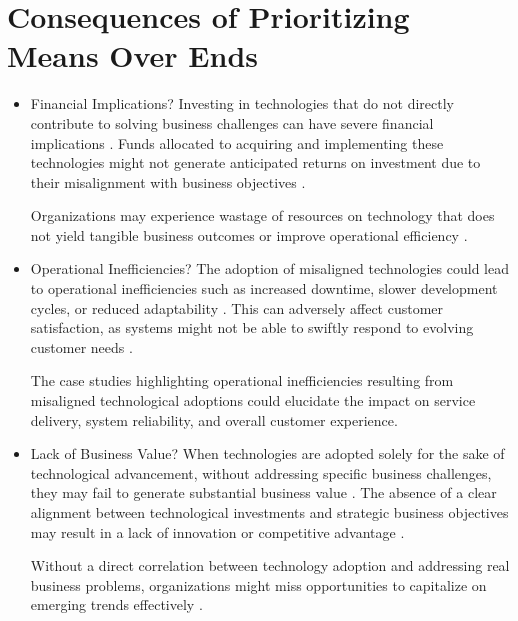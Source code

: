 \documentclass[a4Paper]{article}
\begin{document}
\section{Consequences of Prioritizing Means Over Ends}
\begin{itemize}
    \item Financial Implications?
    Investing in technologies that do not directly contribute to solving business challenges can have severe financial implications \cite{al2020impact}. Funds allocated to acquiring and implementing these technologies might not generate anticipated returns on investment due to their misalignment with business objectives \cite{ilmudeen2019does}.
    
    Organizations may experience wastage of resources on technology that does not yield tangible business outcomes or improve operational efficiency \cite{al2020impact}.
    \item  Operational Inefficiencies?
    The adoption of misaligned technologies could lead to operational inefficiencies such as increased downtime, slower development cycles, or reduced adaptability \cite{rahimi2016business}. This can adversely affect customer satisfaction, as systems might not be able to swiftly respond to evolving customer needs \cite{abrahamsson2017agile}.

    The case studies highlighting operational inefficiencies resulting from misaligned technological adoptions could elucidate the impact on service delivery, system reliability, and overall customer experience.
    \item Lack of Business Value?
    When technologies are adopted solely for the sake of technological advancement, without addressing specific business challenges, they may fail to generate substantial business value \cite{ilmudeen2019does}. The absence of a clear alignment between technological investments and strategic business objectives may result in a lack of innovation or competitive advantage \cite{anzoategui2019endogenous}.

    Without a direct correlation between technology adoption and addressing real business problems, organizations might miss opportunities to capitalize on emerging trends effectively \cite{al2020impact}.
\end{itemize}
\end{document}
